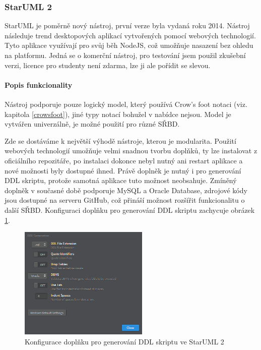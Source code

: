 \documentclass[czech,bachelor,public,dept460,male,oneside]{diploma}
\begin{document}
		\subsubsection{StarUML 2}
		StarUML je poměrně nový nástroj, první verze byla vydaná roku 2014. Nástroj následuje trend desktopových aplikací vytvořených pomocí webových technologií. Tyto aplikace využívají pro svůj běh NodeJS, což umožňuje nasazení bez ohledu na platformu. Jedná se o komerční nástroj, pro testování jsem použil zkušební verzi, licence pro studenty není zdarma, lze ji ale pořídit se slevou.
		
		\paragraph{Popis funkcionality}
		Nástroj podporuje pouze logický model, který používá Crow's foot notaci (viz. kapitola \ref{crowsfoot}), jiné typy notací bohužel v nabídce nejsou. Model je vytvářen univerzálně, je možné  použití pro různé SŘBD. 
		
		Zde se dostáváme k největší výhodě nástroje, kterou je modularita. Použití webových technologií umožňuje velmi snadnou tvorbu doplňků, ty lze instalovat z oficiálního repozitáře, po instalaci dokonce nebyl nutný ani restart aplikace a nové možnosti byly dostupné ihned. Právě doplněk je nutný i pro generování DDL skriptu, protože samotná aplikace tuto možnost neobsahuje. Zmíněný doplněk v současné době podporuje MySQL a Oracle Database, zdrojové kódy jsou dostupné na serveru GitHub, což přináší možnost rozšířit funkcionalitu o další SŘBD. Konfiguraci doplňku pro generování DDL skriptu zachycuje obrázek \ref{fig:editStar}.
		
		\begin{figure}[H]
			\centering
			\includegraphics[width=0.55\textwidth]{Figures/EditorStar}
			\caption[Konfigurace doplňku pro generování DDL skriptu ve StarUML 2]{Konfigurace doplňku pro generování DDL skriptu ve StarUML 2}
			\label{fig:editStar}
		\end{figure}
		
\end{document}
